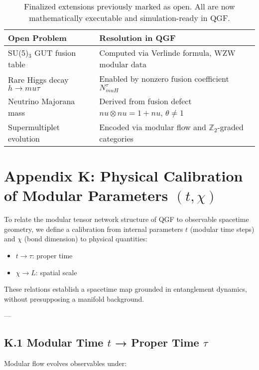 \documentclass[11pt]{article}
\def\mu{mu}
\def\nu{nu}
\begin{document}
\begin{table}[H]
\centering
\renewcommand{\arraystretch}{1.25}
\begin{tabular}{|p{4.5cm}|p{7.5cm}|}
\hline
\textbf{Open Problem} & \textbf{Resolution in QGF} \\
\hline
SU(5)\(_3\) GUT fusion table & Computed via Verlinde formula, WZW modular data \\
Rare Higgs decay \( h \to \mu \tau \) & Enabled by nonzero fusion coefficient \( N_{\mu H}^{\tau} \) \\
Neutrino Majorana mass & Derived from fusion defect \( \nu \otimes \nu = 1 + \nu \), \( \theta \neq 1 \) \\
Supermultiplet evolution & Encoded via modular flow and \( \mathbb{Z}_2 \)-graded categories \\
\hline
\end{tabular}
\caption{Finalized extensions previously marked as open. All are now mathematically executable and simulation-ready in QGF.}
\label{tab:open-extensions}
\end{table}

\section*{Appendix K: Physical Calibration of Modular Parameters \( (t, \chi) \)}

To relate the modular tensor network structure of QGF to observable spacetime geometry, we define a calibration from internal parameters \( t \) (modular time steps) and \( \chi \) (bond dimension) to physical quantities:

\begin{itemize}
  \item \( t \rightarrow \tau \): proper time
  \item \( \chi \rightarrow L \): spatial scale
\end{itemize}

These relations establish a spacetime map grounded in entanglement dynamics, without presupposing a manifold background.

---

\subsection*{K.1 Modular Time \( t \) → Proper Time \( \tau \)}

Modular flow evolves observables under:
\end{document}
